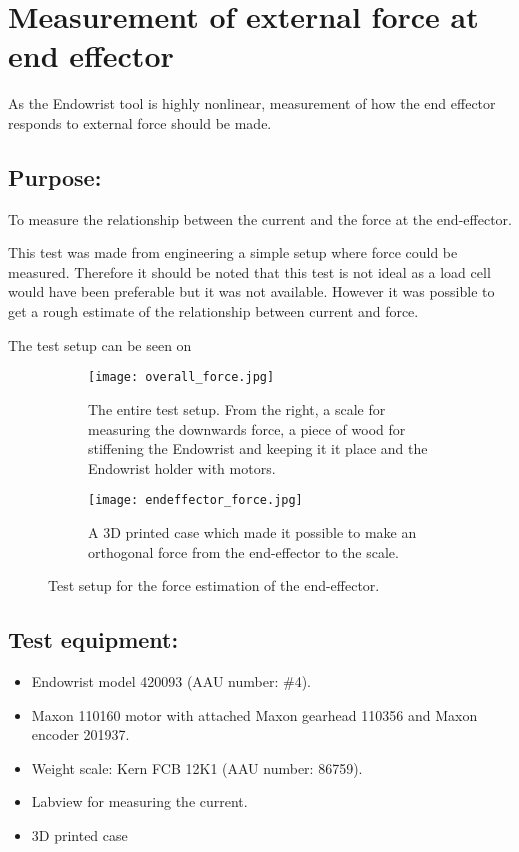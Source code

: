 \section{Measurement of external force at end effector} %

As the Endowrist tool is highly nonlinear, measurement of how the end effector responds to external force should be made.

\subsection*{Purpose:}
To measure the relationship between the current and the force at the end-effector.

This test was made from engineering a simple setup where force could be measured. Therefore it should be noted that this test is not ideal as a load cell would have been preferable but it was not available. However it was possible to get a rough estimate of the relationship between current and force. 

The test setup can be seen on  

\begin{figure}[H]
	\centering
	\begin{subfigure}{.45\textwidth}
		\centering
		\vspace{24pt}
		\texttt{[image: overall\_force.jpg]}
		\caption{The entire test setup. From the right, a scale for measuring the downwards force, a piece of wood for stiffening the Endowrist and keeping it it place and the Endowrist holder with motors.}
		\label{fig:entire_force_testsetup}
	\end{subfigure}
	\begin{subfigure}{.45\textwidth}
		\centering
		\texttt{[image: endeffector\_force.jpg]}
		\caption{A 3D printed case which made it possible to make an orthogonal force from the end-effector to the scale.}
		\label{fig:endeffector_force}
	\end{subfigure}
\caption{Test setup for the force estimation of the end-effector.}
\label{fig:Overview_force}
\end{figure}

\subsection*{Test equipment:}
\begin{itemize}
\item Endowrist model 420093 (AAU number: \#4).
\item Maxon 110160 motor with attached Maxon gearhead 110356 and Maxon encoder 201937.
\item Weight scale: Kern FCB 12K1 (AAU number: 86759).
\item Labview for measuring the current.
\item 3D printed case
\end{itemize}

